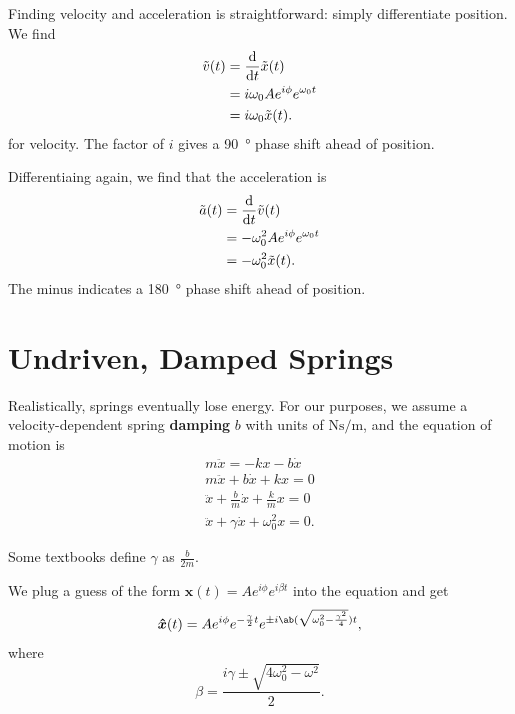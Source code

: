 Finding velocity and acceleration is straightforward: simply
differentiate position.
We find
\begin{equation}
    \begin{aligned}
        \tilde{v}(t) &= \odv{}{t} \tilde{x}(t) \\
        &= i \omega_0 A e^{i \phi} e^{\omega_0 t} \\
        &= i \omega_0 \tilde{x}(t).
    \end{aligned}
\end{equation}
for velocity.
The factor of \(i\) gives a \qty{90}{\degree} phase shift ahead of position.

Differentiaing again, we find that the acceleration is
\begin{equation}
    \begin{aligned}
        \tilde{a}(t) &= \odv{}{t} \tilde{v}(t) \\
        &= - \omega_0^2 A e^{i \phi} e^{\omega_0 t} \\
        &= - \omega_0^2 \tilde{x}(t).
    \end{aligned}
\end{equation}
The minus indicates a \qty{180}{\degree} phase shift ahead of position.

\section{Undriven, Damped Springs}

Realistically, springs eventually lose energy.
For our purposes, we assume a velocity-dependent spring \textbf{damping} \(b\)
with units of \(\unit{\newton \second \per \metre}\),
and the equation of motion is
\begin{equation}
    \begin{aligned}
        m \ddot{x} = - k x - b \dot{x} \\
        m \ddot{x} + b \dot{x} + k x = 0 \\
        \ddot{x} + \frac{b}{m} \dot{x} + \frac{k}{m} x = 0 \\
        \ddot{x} + \gamma \dot{x} + \omega_0^2 x = 0.
    \end{aligned}
\end{equation}

Some textbooks define \(\gamma\) as \(\frac{b}{2m}\).

We plug a guess of the form \(\boldsymbol{\hat{x}}(t) = A e^{i \phi}
e^{i \beta t}\) into the equation
and get
\begin{equation}
    \boldsymbol{\hat{x}}(t)
    = A
    e^{i \phi}
    e^{- \frac{\gamma}{2} t}
    e^{
        \pm i
        \ab(\sqrt{\omega_0^2 - \frac{\gamma^2}{4}})
        t
    },
\end{equation}
where
\begin{equation}
    \beta = \frac{i \gamma \pm \sqrt{4\omega_0^2 - \omega^2}}{2}.
\end{equation}

